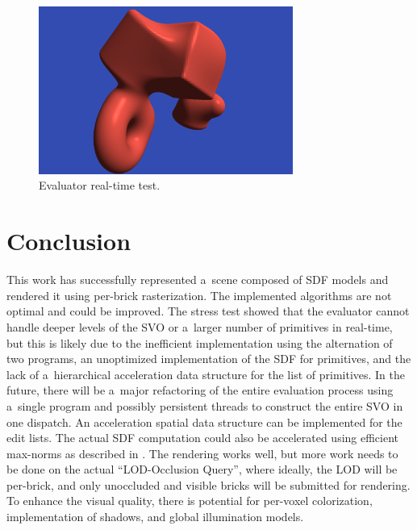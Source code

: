 \documentclass[11pt, a4paper]{article}
\renewcommand{\uv}[1]{``#1''}
\begin{document}
\begin{figure}
    \centering
    \includegraphics[height=5.5cm]{floating.png}
    \caption{Evaluator real-time test.}
    \label{floating}
\end{figure}


\section{Conclusion}

This work has successfully represented a~scene composed of SDF models and rendered it using per-brick rasterization.
The implemented algorithms are not optimal and could be improved.
The stress test showed that the evaluator cannot handle deeper levels of the SVO or a~larger number of primitives in real-time, but this is likely due to the inefficient implementation using the alternation of two programs, an unoptimized implementation of the SDF for primitives, and the lack of a~hierarchical acceleration data structure for the list of primitives.
In the future, there will be a~major refactoring of the entire evaluation process using a~single program and possibly persistent threads to construct the entire SVO in one dispatch.
An acceleration spatial data structure can be implemented for the edit lists.
The actual SDF computation could also be accelerated using efficient max-norms as described in \cite{gokul2003}.
The rendering works well, but more work needs to be done on the actual \uv{LOD-Occlusion Query}, where ideally, the LOD will be per-brick, and only unoccluded and visible bricks will be submitted for rendering.
To enhance the visual quality, there is potential for per-voxel colorization, implementation of shadows, and global illumination models.


\begin{flushleft}
    
\end{flushleft}
\end{document}
